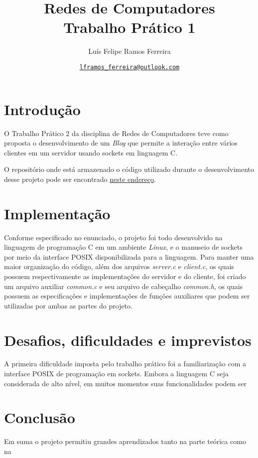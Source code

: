 \documentclass{article}
\title{Redes de Computadores \\ \large Trabalho Prático 1}
\author{Luís Felipe Ramos Ferreira}
\date{\href{mailto:lframos\_ferreira@outlook.com}{\texttt{lframos\_ferreira@outlook.com}}
}
\begin{document}
\maketitle

\section{Introdução}

O Trabalho Prático 2 da disciplina de Redes de Computadores teve como proposta
o desenvolvimento de um \textit{Blog} que permite a interação entre vários clientes em um servidor usando sockets em linguagem C.

O repositório onde está armazenado o código utilizado durante o desenvolvimento
desse projeto
pode ser encontrado \href{https://github.com/lframosferreira/tp2-redes}{neste
      endereço}.

\section{Implementação}

Conforme especificado no enunciado, o projeto foi todo desenvolvido na
linguagem de programação C em um ambiente \textit{Linux}, e o manuseio de
sockets por
meio da interface POSIX
disponibilizada para a linguagem. Para manter uma maior organização do código,
além dos arquivos \textit{server.c} e \textit{client.c}, os quais possuem
respectivamente as implementações do servidor e do cliente,
foi criado um arquivo auxiliar \textit{common.c} e seu arquivo de cabeçalho
\textit{common.h}, os quais possuem as especificações e implementações de
funções auxiliares que podem ser utilizadas por ambas as partes do projeto.

\section{Desafios, dificuldades e imprevistos}

A primeira dificuldade imposta pelo trabalho prático foi a familiarização com a
interface POSIX de programação em sockets. Embora a linguagem C seja
considerada de alto nível, em muitos momentos suas funcionalidades podem ser


\section{Conclusão}

Em suma o projeto permitiu grandes aprendizados tanto na parte teórica como na
\end{document}
